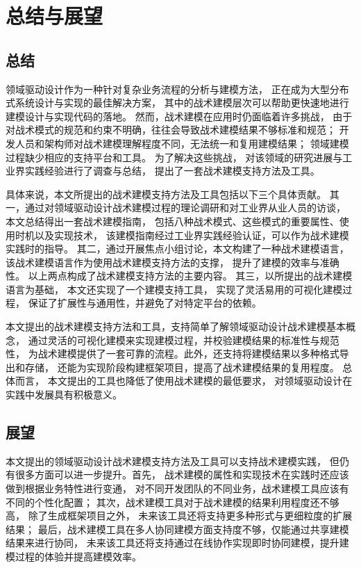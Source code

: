 \chapter{总结与展望}

\section{总结}

领域驱动设计作为一种针对复杂业务流程的分析与建模方法，
正在成为大型分布式系统设计与实现的最佳解决方案，
其中的战术建模层次可以帮助更快速地进行建模设计与实现代码的落地。
然而，战术建模在应用时仍面临着许多挑战，
由于对战术模式的规范和约束不明确，往往会导致战术建模结果不够标准和规范；
开发人员和架构师对战术建模理解程度不同，无法统一和复用建模结果；
领域建模过程缺少相应的支持平台和工具。
为了解决这些挑战，
对该领域的研究进展与工业界实践经验进行了调查与总结，
提出了一套战术建模支持方法及工具。

具体来说，本文所提出的战术建模支持方法及工具包括以下三个具体贡献。
其一，通过对领域驱动设计战术建模过程的理论调研和对工业界从业人员的访谈，
本文总结得出一套战术建模指南，
包括八种战术模式、这些模式的重要属性、使用时机以及实现技术，
该建模指南经过工业界实践经验认证，可以作为战术建模实践时的指导。
其二，通过开展焦点小组讨论，本文构建了一种战术建模语言，
该战术建模语言作为使用战术建模支持方法的支撑，
提升了建模的效率与准确性。
以上两点构成了战术建模支持方法的主要内容。
其三，以所提出的战术建模语言为基础，
本文还实现了一个建模支持工具，
实现了灵活易用的可视化建模过程，
保证了扩展性与通用性，并避免了对特定平台的依赖。

本文提出的战术建模支持方法和工具，支持简单了解领域驱动设计战术建模基本概念，
通过灵活的可视化建模来实现建模过程，并校验建模结果的标准性与规范性，
为战术建模提供了一套可靠的流程。此外，还支持将建模结果以多种格式导出和存储，
还能为实现阶段构建框架项目，提高了战术建模结果的复用程度。
总体而言，
本文提出的工具也降低了使用战术建模的最低要求，
对领域驱动设计在实践中发展具有积极意义。

\section{展望}

本文提出的领域驱动设计战术建模支持方法及工具可以支持战术建模实践，
但仍有很多方面可以进一步提升。首先，
战术建模的属性和实现技术在实践时还应该做到根据业务特性进行变通，
对不同开发团队的不同业务，战术建模工具应该有不同的个性化配置；
其次，战术建模工具对于战术建模的结果利用程度还不够高，
除了生成框架项目之外，
未来该工具还将支持更多种形式与更细粒度的扩展结果；
最后，战术建模工具在多人协同建模方面支持度不够，仅能通过共享建模结果来进行协同，
未来该工具还将支持通过在线协作实现即时协同建模，提升建模过程的体验并提高建模效率。

